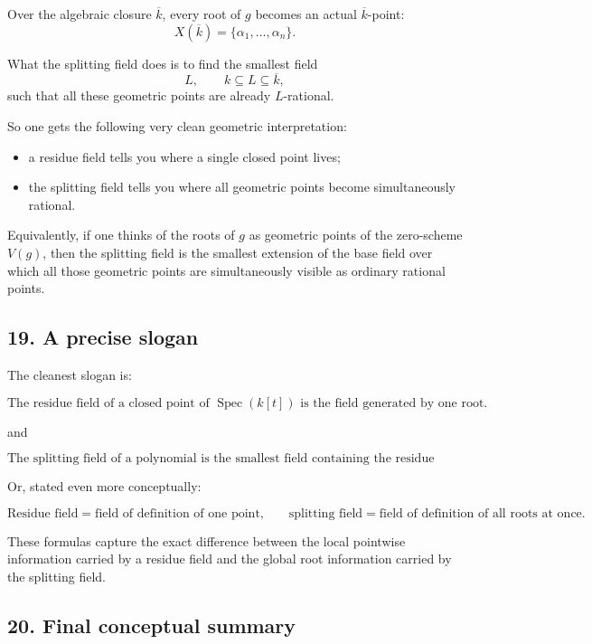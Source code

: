 \documentclass[12pt,a4paper]{article}
\theoremstyle{plain}
\theoremstyle{definition}      %
\begin{document}
Over the algebraic closure \(\overline{k}\), every root of \(g\) becomes an actual \(\overline{k}\)-point:
\[
X(\overline{k})=\{\alpha_1,\dots,\alpha_n\}.
\]

What the splitting field does is to find the smallest field
\[
L,\qquad k\subseteq L\subseteq \overline{k},
\]
such that all these geometric points are already \(L\)-rational.

So one gets the following very clean geometric interpretation:
\begin{itemize}
	\item a residue field tells you where a single closed point lives;
	\item the splitting field tells you where all geometric points become simultaneously rational.
\end{itemize}

Equivalently, if one thinks of the roots of \(g\) as geometric points of the zero-scheme \(V(g)\), then the splitting field is the smallest extension of the base field over which all those geometric points are simultaneously visible as ordinary rational points.

\subsection*{19. A precise slogan}

The cleanest slogan is:

\[
\boxed{
	\text{The residue field of a closed point of }\operatorname{Spec}(k[t])\text{ is the field generated by one root.}
}
\]

and

\[
\boxed{
	\text{The splitting field of a polynomial is the smallest field containing the residue fields of all root-points.}
}
\]

Or, stated even more conceptually:

\[
\boxed{
	\text{Residue field}=\text{field of definition of one point,}
	\qquad
	\text{splitting field}=\text{field of definition of all roots at once.}
}
\]

These formulas capture the exact difference between the local pointwise information carried by a residue field and the global root information carried by the splitting field.

\subsection*{20. Final conceptual summary}
\end{document}
